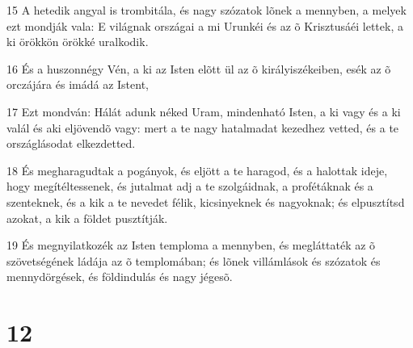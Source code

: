 \par 15 A hetedik angyal is trombitála, és nagy szózatok lõnek a mennyben, a melyek ezt mondják vala: E világnak országai a mi Urunkéi és az õ Krisztusáéi lettek, a ki örökkön örökké uralkodik.
\par 16 És a huszonnégy Vén, a ki az Isten elõtt ül az õ királyiszékeiben, esék az õ orczájára és imádá az Istent,
\par 17 Ezt mondván: Hálát adunk néked Uram, mindenható Isten, a ki vagy és a ki valál és aki eljövendõ vagy: mert a te nagy hatalmadat kezedhez vetted, és a te országlásodat elkezdetted.
\par 18 És megharagudtak a pogányok, és eljött a te haragod, és a halottak ideje, hogy megítéltessenek, és jutalmat adj  a te szolgáidnak, a profétáknak és a szenteknek, és a kik a te nevedet félik, kicsinyeknek és nagyoknak; és elpusztítsd azokat, a kik a földet pusztítják.
\par 19 És megnyilatkozék az Isten temploma a mennyben, és megláttaték az õ szövetségének  ládája az õ templomában; és lõnek villámlások és szózatok és mennydörgések, és földindulás és nagy jégesõ.

\chapter{12}

